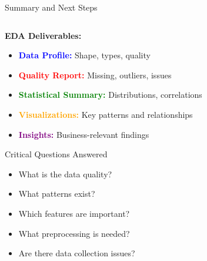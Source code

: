 \documentclass[8pt,aspectratio=1610]{beamer}
\begin{document}
\begin{frame}{Summary and Next Steps}
\begin{columns}[t]
\begin{column}{0.48\textwidth}
\textbf{EDA Deliverables:}
\begin{itemize}
\setlength{\itemsep}{1pt}
\item \textcolor{blue}{\textbf{Data Profile:}} Shape, types, quality
\item \textcolor{red}{\textbf{Quality Report:}} Missing, outliers, issues
\item \textcolor{green}{\textbf{Statistical Summary:}} Distributions, correlations
\item \textcolor{orange}{\textbf{Visualizations:}} Key patterns and relationships
\item \textcolor{purple}{\textbf{Insights:}} Business-relevant findings
\end{itemize}

\vspace{0.3cm}
\begin{block}{Critical Questions Answered}
\begin{itemize}
\setlength{\itemsep}{1pt}
\item What is the data quality?
\item What patterns exist?
\item Which features are important?
\item What preprocessing is needed?
\item Are there data collection issues?
\end{itemize}
\end{block}
\end{column}


\end{columns}
\end{frame}
\end{document}
